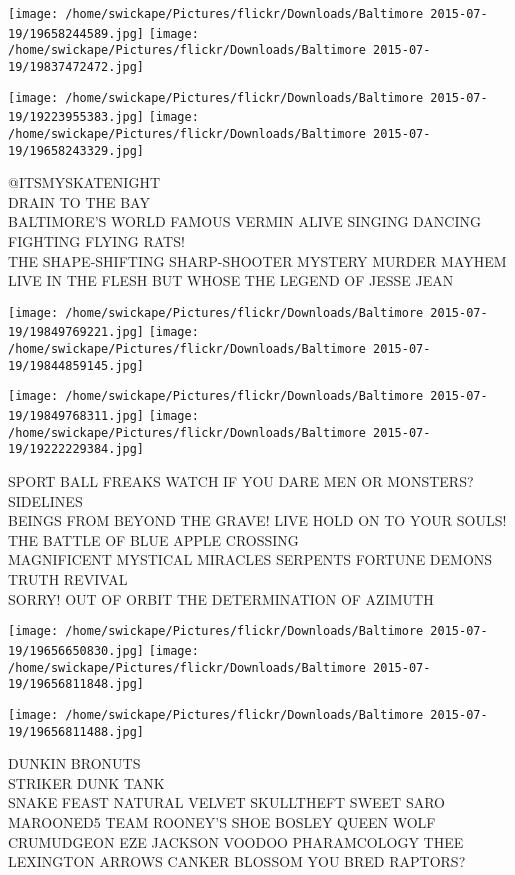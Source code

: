 \documentclass[10pt,letterpaper]{article}
\begin{document}
\texttt{[image: /home/swickape/Pictures/flickr/Downloads/Baltimore 2015-07-19/19658244589.jpg]}
\texttt{[image: /home/swickape/Pictures/flickr/Downloads/Baltimore 2015-07-19/19837472472.jpg]}

\texttt{[image: /home/swickape/Pictures/flickr/Downloads/Baltimore 2015-07-19/19223955383.jpg]}
\texttt{[image: /home/swickape/Pictures/flickr/Downloads/Baltimore 2015-07-19/19658243329.jpg]}

@ITSMYSKATENIGHT\\
DRAIN TO THE BAY\\
BALTIMORE'S WORLD FAMOUS VERMIN ALIVE SINGING DANCING FIGHTING FLYING RATS!\\
THE SHAPE{-}SHIFTING SHARP{-}SHOOTER MYSTERY MURDER MAYHEM LIVE IN THE FLESH BUT WHOSE THE LEGEND OF JESSE JEAN\\
\pagebreak

\texttt{[image: /home/swickape/Pictures/flickr/Downloads/Baltimore 2015-07-19/19849769221.jpg]}
\texttt{[image: /home/swickape/Pictures/flickr/Downloads/Baltimore 2015-07-19/19844859145.jpg]}

\texttt{[image: /home/swickape/Pictures/flickr/Downloads/Baltimore 2015-07-19/19849768311.jpg]}
\texttt{[image: /home/swickape/Pictures/flickr/Downloads/Baltimore 2015-07-19/19222229384.jpg]}

SPORT BALL FREAKS WATCH IF YOU DARE MEN OR MONSTERS?  SIDELINES\\
BEINGS FROM BEYOND THE GRAVE!   LIVE HOLD ON TO YOUR SOULS!  THE BATTLE OF BLUE APPLE CROSSING\\
MAGNIFICENT MYSTICAL MIRACLES SERPENTS FORTUNE DEMONS TRUTH REVIVAL\\
SORRY!  OUT OF ORBIT THE DETERMINATION OF AZIMUTH\\
\pagebreak

\texttt{[image: /home/swickape/Pictures/flickr/Downloads/Baltimore 2015-07-19/19656650830.jpg]}
\texttt{[image: /home/swickape/Pictures/flickr/Downloads/Baltimore 2015-07-19/19656811848.jpg]}

\texttt{[image: /home/swickape/Pictures/flickr/Downloads/Baltimore 2015-07-19/19656811488.jpg]}

DUNKIN BRONUTS\\
STRIKER DUNK TANK\\
SNAKE FEAST NATURAL VELVET SKULLTHEFT SWEET SARO MAROONED5 TEAM ROONEY'S SHOE BOSLEY QUEEN WOLF CRUMUDGEON EZE JACKSON VOODOO PHARAMCOLOGY THEE LEXINGTON ARROWS CANKER BLOSSOM YOU BRED RAPTORS?\\
\pagebreak
\end{document}
